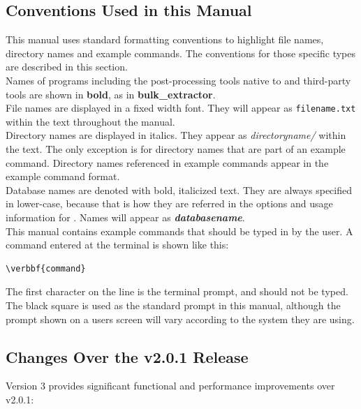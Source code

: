 \documentclass[11pt,fleqn]{article} %
\begin{document}
\subsection{Conventions Used in this Manual}
This manual uses standard formatting conventions to highlight file names, directory names and example commands. The conventions for those specific types are described in this section. \\

Names of programs including the post-processing tools native to \hdb and third-party tools are shown in \textbf{bold}, as in \textbf{bulk\_extractor}.\\

File names are displayed in a fixed width font. They will appear as \texttt{filename.txt} within the text throughout the manual.\\

Directory names are displayed in italics. They appear as \textit{directoryname/} within the text. The only exception is for directory names that are part of an example command. Directory names referenced in example commands appear in the example command format.\\

Database names are denoted with bold, italicized text. They are always specified in lower-case, because that is how they are referred in the options and usage information for \hdb. Names will appear as \textbf{\textit{databasename}}.\\

This manual contains example commands that should be typed in by the user. A command entered at the terminal is shown like this: \begin{Verbatim}[commandchars=\\\{\}]
\verbbf{command}
\end{Verbatim}

The first character on the line is the terminal prompt, and should not be typed. The black square is used as the standard prompt in this manual, although the prompt shown on a users screen will vary according to the system they are using.\\

\subsection{Changes Over the \hdb v2.0.1 Release}
\hdb Version 3 provides significant functional and performance improvements over v2.0.1:
\end{document}
